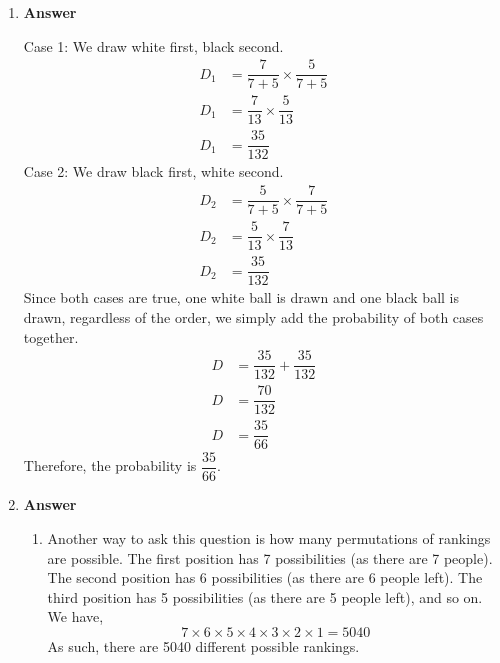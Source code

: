 \documentclass[12pt]{book}
\begin{document}
\newcommand{\reporttitle}{Assignment 1}
\newcommand{\reportauthorOne}{Kien Do}
\newcommand{\cidOne}{300163370}






\begin{enumerate}
    \item \textbf{Answer}
    
    Case 1: We draw white first, black second.
    \begin{align*}
        D_1 &= \dfrac{7}{7+5} \times \dfrac{5}{7+5} \\
        D_1 &= \dfrac{7}{13} \times \dfrac{5}{13} \\
        D_1 &= \dfrac{35}{132}
    \end{align*}
    Case 2: We draw black first, white second.
    \begin{align*}
        D_2 &= \dfrac{5}{7+5} \times \dfrac{7}{7+5} \\
        D_2 &= \dfrac{5}{13} \times \dfrac{7}{13} \\
        D_2 &= \dfrac{35}{132}
    \end{align*}
    Since both cases are true, one white ball is drawn and one black ball is drawn, regardless of the order, we simply add the probability of both cases together.
    \begin{align*}
        D &= \dfrac{35}{132} + \dfrac{35}{132} \\
        D &= \dfrac{70}{132} \\
        D &= \dfrac{35}{66}
    \end{align*}
    Therefore, the probability is $\dfrac{35}{66}$.
    
    \item \textbf{Answer}
    \begin{enumerate}
        \item Another way to ask this question is how many permutations of rankings are possible. The first position has 7 possibilities (as there are 7 people). The second position has 6 possibilities (as there are 6 people left). The third position has 5 possibilities (as there are 5 people left), and so on. We have,
        $$7 \times 6 \times 5 \times 4 \times 3 \times 2 \times 1 = 5040$$
        As such, there are 5040 different possible rankings.
        

\end{enumerate}
\end{enumerate}
\end{document}

